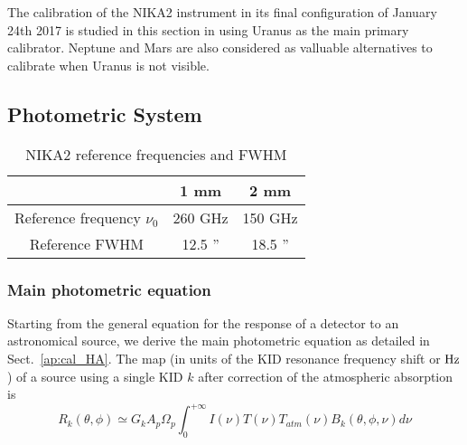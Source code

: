 %





The calibration of the NIKA2 instrument in its final configuration of
January 24th 2017 is studied in this section in using Uranus as the
main primary calibrator. Neptune and Mars are also considered as
valluable alternatives to calibrate when Uranus is not visible.

\subsection{Photometric System}
\label{se:cal_HA}

\begin{table}[h]
\begin{center}
\begin{tabular}{|c|c|c|}
\hline
     & 1 mm & 2 mm \\
\hline
Reference frequency $\nu_{0}$ & 260 GHz & 150 GHz \\
\hline
Reference FWHM                      & 12.5  '' & 18.5 '' \\
\hline
\end{tabular}
\caption{NIKA2 reference frequencies and FWHM}
\end{center}
\label{tab:definitions}
\end{table}

\subsubsection{Main photometric equation}

Starting from the general equation for the response of a detector to
an astronomical source, we derive the main photometric equation as
detailed in Sect.~\ref{ap:cal_HA}.
The map (in units of the KID resonance frequency shift or $\rm Hz$) of a source using a single KID $k$
after correction of the atmospheric absorption is
\begin{equation}
R_{k}(\theta, \phi) \simeq G_{k}  A_{p}\Omega_{p} \int_{0}^{+\infty} I(\nu)
T(\nu) T_{atm}(\nu) B_{k} (\theta, \phi, \nu)  d\nu 
\label{eq:mainphot}
\end{equation}

